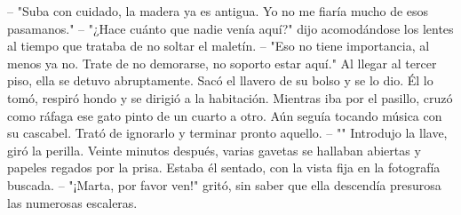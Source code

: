 \markdownRendererInterblockSeparator
{}-- "Suba con cuidado, la madera ya es antigua. Yo no me fiaría mucho de esos pasamanos."\markdownRendererInterblockSeparator
{}-- "¿Hace cuánto que nadie venía aquí?" dijo acomodándose los lentes al tiempo que trataba de no soltar el maletín.\markdownRendererInterblockSeparator
{}-- "Eso no tiene importancia, al menos ya no. Trate de no demorarse, no soporto estar aquí."\markdownRendererInterblockSeparator
{}Al llegar al tercer piso, ella se detuvo abruptamente. Sacó el llavero de su bolso y se lo dio. Él lo tomó, respiró hondo y se dirigió a la habitación. Mientras iba por el pasillo, cruzó como ráfaga ese gato pinto de un cuarto a otro. Aún seguía tocando música con su cascabel. Trató de ignorarlo y terminar pronto aquello.\markdownRendererInterblockSeparator
{}-- "" Introdujo la llave, giró la perilla. Veinte minutos después, varias gavetas se hallaban abiertas y papeles regados por la prisa. Estaba él sentado, con la vista fija en la fotografía buscada.\markdownRendererInterblockSeparator
{}-- "¡Marta, por favor ven!" gritó, sin saber que ella descendía presurosa las numerosas escaleras.\relax